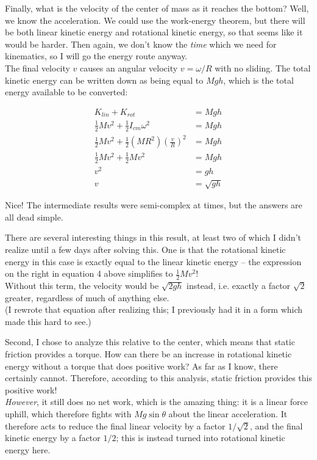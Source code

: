 \documentclass[8.01x]{subfiles}
\begin{document}
Finally, what is the velocity of the center of mass as it reaches the bottom? Well, we know the acceleration. We could use the work-energy theorem, but there will be both linear kinetic energy and rotational kinetic energy, so that seems like it would be harder. Then again, we don't know the \emph{time} which we need for kinematics, so I will go the energy route anyway.\\
The final velocity $v$ causes an angular velocity $v = \omega/R$ with no sliding. The total kinetic energy can be written down as being equal to $M g h$, which is the total energy available to be converted:

\begin{align}
K_{lin} + K_{rot} &= M g h\\
\frac{1}{2} M v^2 + \frac{1}{2} I_{cm} \omega^2 &= M g h\\
\frac{1}{2} M v^2 + \frac{1}{2} (M R^2) \left(\frac{v}{R}\right)^2 &= M g h\\
\frac{1}{2} M v^2 + \frac{1}{2} M v^2 &= M g h\\
v^2 &= g h\\
v &= \sqrt{g h}
\end{align}

Nice! The intermediate results were semi-complex at times, but the answers are all dead simple.

There are several interesting things in this result, at least two of which I didn't realize until a few days after solving this. One is that the rotational kinetic energy in this case is exactly equal to the linear kinetic energy -- the expression on the right in equation 4 above simplifies to $\frac{1}{2} M v^2$!\\
Without this term, the velocity would be $\sqrt{2 g h}$ instead, i.e. exactly a factor $\sqrt{2}$ greater, regardless of much of anything else.\\
(I rewrote that equation after realizing this; I previously had it in a form which made this hard to see.)

Second, I chose to analyze this relative to the center, which means that static friction provides a torque. How can there be an increase in rotational kinetic energy without a torque that does positive work? As far as I know, there certainly cannot. Therefore, according to this analysis, static friction provides this positive work!\\
\emph{However}, it still does no net work, which is the amazing thing: it is a linear force uphill, which therefore fights with $M g \sin \theta$ about the linear acceleration. It therefore acts to reduce the final linear velocity by a factor $1/\sqrt{2}$, and the final kinetic energy by a factor $1/2$; this is instead turned into rotational kinetic energy here.
\end{document}
